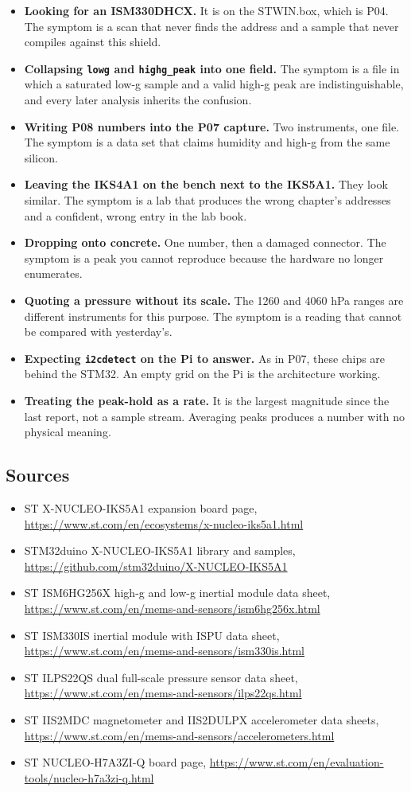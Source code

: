 \begin{itemize}
\item \textbf{Looking for an ISM330DHCX.} It is on the STWIN.box, which is P04. The symptom
is a scan that never finds the address and a sample that never compiles against this
shield.
\item \textbf{Collapsing \texttt{lowg} and \texttt{highg\_peak} into one field.} The
symptom is a file in which a saturated low-g sample and a valid high-g peak are
indistinguishable, and every later analysis inherits the confusion.
\item \textbf{Writing P08 numbers into the P07 capture.} Two instruments, one file. The
symptom is a data set that claims humidity and high-g from the same silicon.
\item \textbf{Leaving the IKS4A1 on the bench next to the IKS5A1.} They look similar. The
symptom is a lab that produces the wrong chapter's addresses and a confident, wrong entry
in the lab book.
\item \textbf{Dropping onto concrete.} One number, then a damaged connector. The symptom is
a peak you cannot reproduce because the hardware no longer enumerates.
\item \textbf{Quoting a pressure without its scale.} The 1260 and 4060 hPa ranges are
different instruments for this purpose. The symptom is a reading that cannot be compared
with yesterday's.
\item \textbf{Expecting \texttt{i2cdetect} on the Pi to answer.} As in P07, these chips are
behind the STM32. An empty grid on the Pi is the architecture working.
\item \textbf{Treating the peak-hold as a rate.} It is the largest magnitude since the last
report, not a sample stream. Averaging peaks produces a number with no physical meaning.
\end{itemize}

\subsection*{Sources}

\begin{itemize}
\item ST X-NUCLEO-IKS5A1 expansion board page,
\url{https://www.st.com/en/ecosystems/x-nucleo-iks5a1.html}
\item STM32duino X-NUCLEO-IKS5A1 library and samples,
\url{https://github.com/stm32duino/X-NUCLEO-IKS5A1}
\item ST ISM6HG256X high-g and low-g inertial module data sheet,
\url{https://www.st.com/en/mems-and-sensors/ism6hg256x.html}
\item ST ISM330IS inertial module with ISPU data sheet,
\url{https://www.st.com/en/mems-and-sensors/ism330is.html}
\item ST ILPS22QS dual full-scale pressure sensor data sheet,
\url{https://www.st.com/en/mems-and-sensors/ilps22qs.html}
\item ST IIS2MDC magnetometer and IIS2DULPX accelerometer data sheets,
\url{https://www.st.com/en/mems-and-sensors/accelerometers.html}
\item ST NUCLEO-H7A3ZI-Q board page,
\url{https://www.st.com/en/evaluation-tools/nucleo-h7a3zi-q.html}
\end{itemize}
